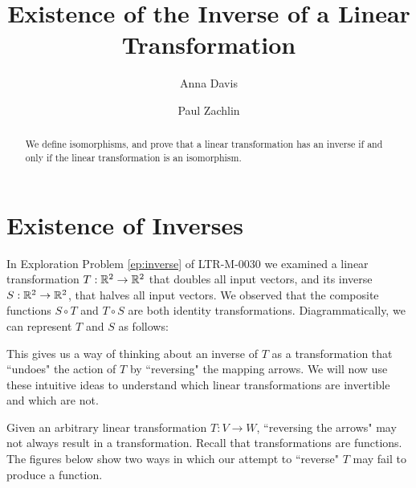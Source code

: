 \documentclass{ximera}
\author{Anna Davis \and Paul Zachlin} \title{Existence of the Inverse of a Linear Transformation} \license{CC-BY 4.0}
\begin{document}
\begin{abstract}
  We define  isomorphisms, and prove that a linear transformation has an inverse if and only if the linear transformation is an isomorphism.
\end{abstract}
\maketitle



\section*{Existence of Inverses}

In Exploration Problem \ref{ep:inverse} of LTR-M-0030 we examined a linear transformation $T:\mathbb{R}^2\rightarrow \mathbb{R}^2$ that doubles all input vectors, and its inverse $S:\mathbb{R}^2\rightarrow \mathbb{R}^2$, that halves all input vectors.  We observed that the composite functions $S\circ T$ and $T\circ S$ are both identity transformations.  Diagrammatically, we can represent $T$ and $S$ as follows:
 \begin{center}
\end{center}

This gives us a way of thinking about an inverse of $T$ as a transformation that ``undoes" the action of $T$ by ``reversing" the mapping arrows.  We will now use these intuitive ideas to understand which linear transformations are invertible and which are not.

Given an arbitrary linear transformation $T:V\rightarrow W$, ``reversing the arrows"
 may not always result in a transformation. Recall that transformations are functions.  The figures below show two ways in which our attempt to ``reverse" $T$ may fail to produce a function.
 
\end{document}

